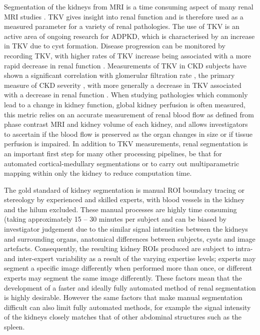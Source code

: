 Segmentation of the kidneys from \ac{MRI} is a time consuming aspect of many renal \ac{MRI} studies \cite{cox_multiparametric_2017, cohen_mri_2009, van_den_dool_functional_2005}. \ac{TKV} gives insight into renal function and is therefore used as a measured parameter for a variety of renal pathologies. The use of \ac{TKV} is an active area of ongoing research for \ac{ADPKD}, which is characterised by an increase in \ac{TKV} due to cyst formation. Disease progression can be monitored by recording \ac{TKV}, with higher rates of \ac{TKV} increase being associated with a more rapid decrease in renal function \cite{chapman_kidney_2012, tangri_total_2017, grantham_volume_2006}. Measurements of \ac{TKV} in \ac{CKD} subjects have shown a significant correlation with glomerular filtration rate \cite{buchanan_quantitative_2019}, the primary measure of \ac{CKD} severity \cite{stevens_assessing_2006}, with more generally a decrease in \ac{TKV} associated with a decrease in renal function \cite{gong_relationship_2012}. When studying pathologies which commonly lead to a change in kidney function, global kidney perfusion is often measured, this metric relies on an accurate measurement of renal blood flow as defined from phase contrast \ac{MRI} \cite{boer_consensus-based_2020} and kidney volume of each kidney, and allows investigators to ascertain if the blood flow is preserved as the organ changes in size or if tissue perfusion is impaired. In addition to \ac{TKV} measurements, renal segmentation is an important first step for many other processing pipelines, be that for automated cortical-medullary segmentations or to carry out multiparametric mapping within only the kidney to reduce computation time. 

The gold standard of kidney segmentation is manual \ac{ROI} boundary tracing \cite{di_leo_measurement_2011} or stereology \cite{bae_volumetric_2000} by experienced and skilled experts, with blood vessels in the kidney and the hilum excluded. These manual processes are highly time consuming (taking approximately 15 – 30 minutes per subject \cite{zollner_assessment_2012, sharma_kidney_2017, simms_rapid_2019} and can be biased by investigator judgement due to the similar signal intensities between the kidneys and surrounding organs, anatomical differences between subjects, cysts and image artefacts. Consequently, the resulting kidney \ac{ROI}s produced are subject to intra- and inter-expert variability as a result of the varying expertise levels; experts may segment a specific image differently when performed more than once, or different experts may segment the same image differently. These factors mean that the development of a faster and ideally fully automated method of renal segmentation is highly desirable. However the same factors that make manual segmentation difficult can also limit fully automated methods, for example the signal intensity of the kidneys closely matches that of other abdominal structures such as the spleen.

